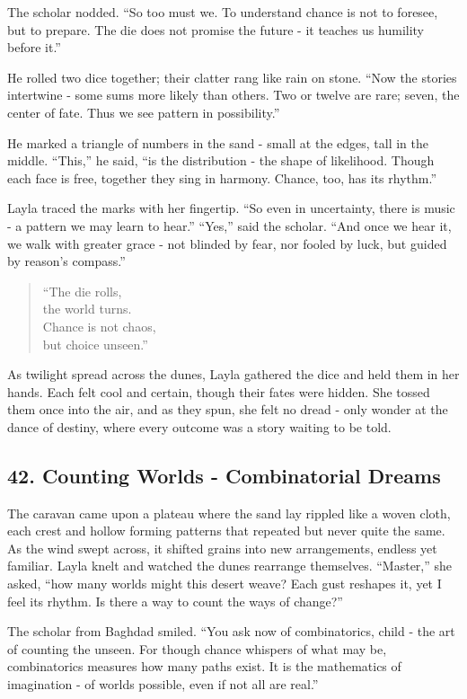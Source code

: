 \documentclass[
  letterpaper,
  DIV=11,
  numbers=noendperiod]{scrreprt}
\begin{document}
The scholar nodded. ``So too must we. To understand chance is not to
foresee, but to prepare. The die does not promise the future - it
teaches us humility before it.''

He rolled two dice together; their clatter rang like rain on stone.
``Now the stories intertwine - some sums more likely than others. Two or
twelve are rare; seven, the center of fate. Thus we see pattern in
possibility.''

He marked a triangle of numbers in the sand - small at the edges, tall
in the middle. ``This,'' he said, ``is the distribution - the shape of
likelihood. Though each face is free, together they sing in harmony.
Chance, too, has its rhythm.''

Layla traced the marks with her fingertip. ``So even in uncertainty,
there is music - a pattern we may learn to hear.'' ``Yes,'' said the
scholar. ``And once we hear it, we walk with greater grace - not blinded
by fear, nor fooled by luck, but guided by reason's compass.''

\begin{quote}
``The die rolls,\\
the world turns.\\
Chance is not chaos,\\
but choice unseen.''
\end{quote}

As twilight spread across the dunes, Layla gathered the dice and held
them in her hands. Each felt cool and certain, though their fates were
hidden. She tossed them once into the air, and as they spun, she felt no
dread - only wonder at the dance of destiny, where every outcome was a
story waiting to be told.

\subsection{42. Counting Worlds - Combinatorial
Dreams}\label{counting-worlds---combinatorial-dreams}

The caravan came upon a plateau where the sand lay rippled like a woven
cloth, each crest and hollow forming patterns that repeated but never
quite the same. As the wind swept across, it shifted grains into new
arrangements, endless yet familiar. Layla knelt and watched the dunes
rearrange themselves. ``Master,'' she asked, ``how many worlds might
this desert weave? Each gust reshapes it, yet I feel its rhythm. Is
there a way to count the ways of change?''

The scholar from Baghdad smiled. ``You ask now of combinatorics, child -
the art of counting the unseen. For though chance whispers of what may
be, combinatorics measures how many paths exist. It is the mathematics
of imagination - of worlds possible, even if not all are real.''
\end{document}
